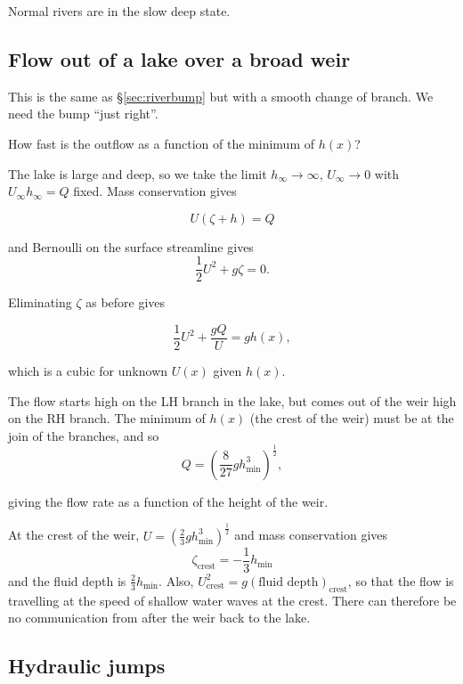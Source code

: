 \documentclass{notes}
\begin{document}
Normal rivers are in the slow deep state.

\subsection{Flow out of a lake over a broad weir}\label{sec:weir}

This is the same as \S\ref{sec:riverbump} but with a smooth change of
branch.  We need the bump ``just right''.

\vspace{1.5in}

How fast is the outflow as a function of the minimum of $h(x)$?

The lake is large and deep, so we take the limit $h_\infty \to
\infty$, $U_\infty \to 0$ with $U_\infty h_\infty = Q$ fixed.  Mass
conservation gives

\[
U (\zeta + h) = Q
\]

and Bernoulli on the surface streamline gives
\[
\frac{1}{2} U^2 + g \zeta = 0.
\]

Eliminating $\zeta$ as before gives

\begin{equation}\label{eq:river2}
\frac{1}{2} U^2 + \frac{g Q}{U} = g h(x),
\end{equation}

which is a cubic for unknown $U(x)$ given $h(x)$.

\vspace{2in}

The flow starts high on the LH branch in the lake, but comes out of
the weir high on the RH branch.  The minimum of $h(x)$ (the crest of
the weir) must be at the join of the branches, and so
\[
Q = \left( \frac{8}{27} g h_{\text{min}}^3 \right)^{\frac{1}{2}},
\]

giving the flow rate as a function of the height of the weir.

At the crest of the weir,
$U = \left( \frac{2}{3} g h_{\text{min}}^3 \right)^{\frac{1}{2}}$ and
mass conservation gives
\[
\zeta_{\text{crest}} = - \frac{1}{3} h_{\text{min}}
\]
and the fluid depth is $\frac{2}{3} h_{\text{min}}$.  Also,
$U^2_{\text{crest}} = g ( \text{fluid depth} )_{\text{crest}}$, so
that the flow is travelling at the speed of shallow water waves at the
crest.  There can therefore be no communication from after the weir
back to the lake.

\subsection{Hydraulic jumps}\label{sec:hydraulic}
\end{document}
